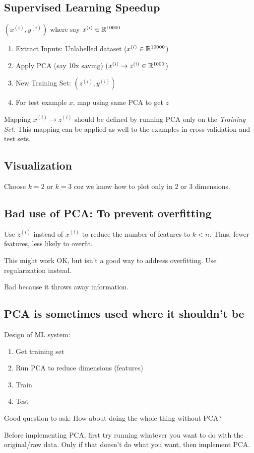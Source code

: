\subsection{Supervised Learning Speedup}
$(x^{(i)}, y^{(i)})$ where say $x^{(i)} \in \mathbb{R}^{10000}$
\begin{enumerate}
	\item Extract Inputs: Unlabelled dataset ($x^{(i)} \in \mathbb{R}^{10000}$)
	\item Apply PCA (say 10x saving) ($x^{(i)} \to z^{(i)} \in \mathbb{R}^{1000}$)
	\item New Training Set: $(z^{(i)}, y^{(i)})$
	\item For test example $x$, map using same PCA to get $z$
\end{enumerate}
\begin{remark}
	Mapping $x^{(i)} \to z^{(i)}$ should be defined by running PCA only on
	the \emph{Training Set}. This mapping can be applied as well to the
	examples in cross-validation and test sets.
\end{remark}

\subsection{Visualization}
Choose $k = 2$ or $k = 3$ coz we know how to plot only in 2 or 3 dimensions.

\subsection{Bad use of PCA: To prevent overfitting}
Use $z^{(i)}$ instead of $x^{(i)}$ to reduce the number of features to $k < n$.
Thus, fewer features, less likely to overfit.

This might work OK, but isn't a good way to address overfitting. Use regularization
instead.

Bad because it throws away information.

\subsection{PCA is sometimes used where it shouldn't be}
Design of ML system:
\begin{enumerate}
	\item Get training set
	\item Run PCA to reduce dimensions (features)
	\item Train
	\item Test
\end{enumerate}

Good question to ask: How about doing the whole thing without PCA?

Before implementing PCA, first try running whatever you want to do with the
original/raw data. Only if that doesn't do what you want, then implement
PCA.

